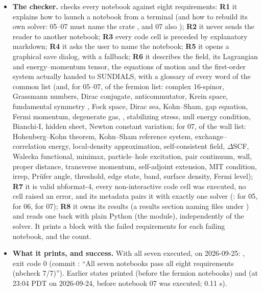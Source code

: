 \begin{itemize}
  \item \textbf{The checker.}  checks every notebook against eight requirements: \textbf{R1} it explains how to launch a notebook from a terminal (and how to rebuild its own solver: 05--07 must name the crate , and 07 also ); \textbf{R2} it never sends the reader to another notebook; \textbf{R3} every code cell is preceded by explanatory markdown; \textbf{R4} it asks the user to name the notebook; \textbf{R5} it opens a graphical save dialog, with a fallback; \textbf{R6} it describes the field, its Lagrangian and energy--momentum tensor, the equations of motion and the first-order system actually handed to SUNDIALS, with a glossary of every word of the common list (and, for 05--07, of the fermion list: complex 16-spinor, Grassmann numbers, Dirac conjugate, anticommutator, Krein space, fundamental symmetry , Fock space, Dirac sea, Kohn--Sham, gap equation, Fermi momentum, degenerate gas, , stabilizing stress, null energy condition, Bianchi-I, hidden sheet, Newton constant variation; for 07, of the wall list: Hohenberg--Kohn theorem, Kohn--Sham reference system, exchange--correlation energy, local-density approximation, self-consistent field, $\Delta$SCF, Walecka functional, minimax, particle--hole excitation, pair continuum, wall, proper distance, transverse momentum, self-adjoint extension, MIT condition, irrep, Prüfer angle, threshold, edge state, band, surface density, Fermi level); \textbf{R7} it is valid nbformat-4, every non-interactive code cell was executed, no cell raised an error, and its metadata pairs it with exactly one solver (:  for 05,  for 06,  for 07); \textbf{R8} it owns its results (a results section naming files under ) and reads one back with plain Python (the  module), independently of the solver. It prints a  block with the failed requirements for each failing notebook, and the count.
  \item \textbf{What it prints, and success.} With all seven executed, on 2026-09-25: , exit code 0 (commit : ``All seven notebooks pass all eight requirements (nbcheck 7/7)''). Earlier states printed  (before the fermion notebooks) and  (at 23:04 PDT on 2026-09-24, before notebook 07 was executed; 0.11 s).

\end{itemize}
